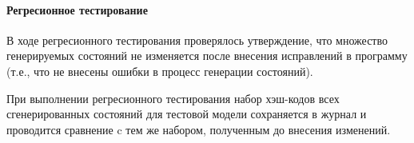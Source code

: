 \paragraph{Регресионное тестирование}

В ходе регресионного тестирования проверялось утверждение, что множество генерируемых
состояний не изменяется после внесения исправлений в программу (т.е., что не внесены
ошибки в процесс генерации состояний).

При выполнении регресионного тестирования набор хэш-кодов всех сгенерированных состояний
для тестовой модели сохраняется в журнал и проводится сравнение c тем же набором,
полученным до внесения изменений.


